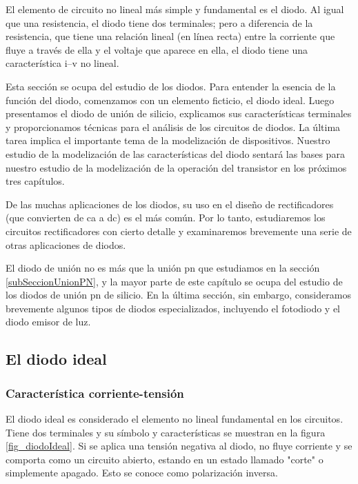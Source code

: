 El elemento de circuito no lineal más simple y fundamental es el diodo. Al igual que una resistencia, el diodo tiene dos terminales; pero a diferencia de la resistencia, que tiene una relación lineal (en línea recta) entre la corriente que fluye a través de ella y el voltaje que aparece en ella, el diodo tiene una característica i–v no lineal.

Esta sección se ocupa del estudio de los diodos. Para entender la esencia de la función del diodo, comenzamos con un elemento ficticio, el diodo ideal. Luego presentamos el diodo de unión de silicio, explicamos sus características terminales y proporcionamos técnicas para el análisis de los circuitos de diodos. La última tarea implica el importante tema de la modelización de dispositivos. Nuestro estudio de la modelización de las características del diodo sentará las bases para nuestro estudio de la modelización de la operación del transistor en los próximos tres capítulos.

De las muchas aplicaciones de los diodos, su uso en el diseño de rectificadores (que convierten de ca a dc) es el más común. Por lo tanto, estudiaremos los circuitos rectificadores con cierto detalle y examinaremos brevemente una serie de otras aplicaciones de diodos.

El diodo de unión no es más que la unión pn que estudiamos en la sección \ref{subSeccionUnionPN}, y la mayor parte de este capítulo se ocupa del estudio de los diodos de unión pn de silicio. En la última sección, sin embargo, consideramos brevemente algunos tipos de diodos especializados, incluyendo el fotodiodo y el diodo emisor de luz.

\subsection{El diodo ideal} \label{sSubSeccionDiodoIdeal}

\subsubsection{Característica corriente-tensión}

El diodo ideal es considerado el elemento no lineal fundamental en los circuitos. Tiene dos terminales y su símbolo y características se muestran en la figura \ref{fig_diodoIdeal}. Si se aplica una tensión negativa al diodo, no fluye corriente y se comporta como un circuito abierto, estando en un estado llamado "corte" o simplemente apagado. Esto se conoce como polarización inversa.

